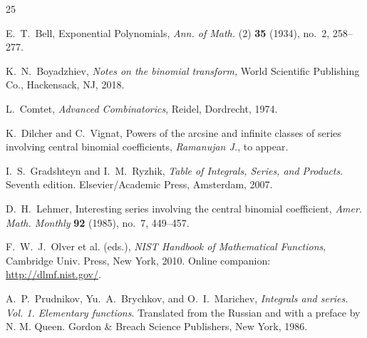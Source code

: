 \documentclass{amsart}
\theoremstyle{definition}
\theoremstyle{remark}
\numberwithin{equation}{section}
\begin{document}
\begin{thebibliography}{25}

 E.~T.~Bell, Exponential Polynomials, {\it Ann. of Math.} (2) 
{\bf 35} (1934), no.~2, 258--277.

 K.~N.~Boyadzhiev, {\it Notes on the binomial transform\/,}
World Scientific Publishing Co., Hackensack, NJ, 2018.

 L.~Comtet, {\it Advanced Combinatorics\/}, Reidel, Dordrecht,
1974.

 K.~Dilcher and C.~Vignat, Powers of the arcsine and
infinite classes of series involving central binomial coefficients,
{\it Ramanujan J.}, to appear.

 I.~S.~Gradshteyn and I.~M.~Ryzhik, {\it Table of Integrals,
Series, and Products\/}.
Seventh edition. Elsevier/Academic Press, Amsterdam, 2007.

 D.~H.~Lehmer, 
Interesting series involving the central binomial coefficient,
{\it Amer. Math. Monthly} {\bf 92} (1985), no.~7, 449--457.

 F.~W.~J.~Olver et al. (eds.), {\it NIST Handbook of Mathematical
Functions\/}, Cambridge Univ. Press, New York, 2010.
Online companion: \url{http://dlmf.nist.gov/}.

 A.~P.~Prudnikov, Yu.~A.~Brychkov, and O.~I.~Marichev,
{\it Integrals and series. Vol. 1. Elementary functions\/}. Translated from
the Russian and with a preface by N. M. Queen. Gordon \& Breach Science
Publishers, New York, 1986.

\end{thebibliography}
\end{document}
